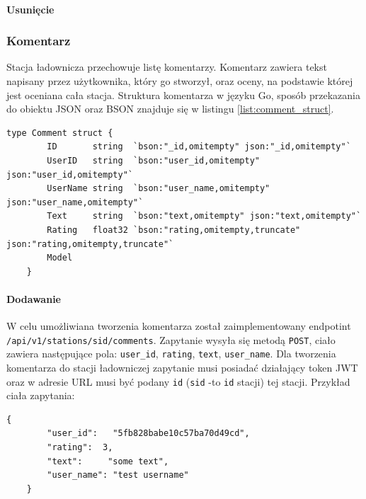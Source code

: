 \paragraph{Usunięcie}
\subsubsection{Komentarz}
Stacja ładownicza przechowuje listę komentarzy. Komentarz zawiera tekst napisany przez użytkownika, który go stworzył, oraz oceny, na podstawie której jest oceniana cała stacja.
Struktura komentarza w języku Go, sposób przekazania do obiektu JSON oraz BSON znajduje się w listingu \ref{list:comment_struct}.
\begin{lstlisting}[label=list:comment_struct,caption=Struktura komentarza,basicstyle=\tiny\ttfamily]
    type Comment struct {
        ID       string  `bson:"_id,omitempty" json:"_id,omitempty"`
        UserID   string  `bson:"user_id,omitempty" json:"user_id,omitempty"`
        UserName string  `bson:"user_name,omitempty" json:"user_name,omitempty"`
        Text     string  `bson:"text,omitempty" json:"text,omitempty"`
        Rating   float32 `bson:"rating,omitempty,truncate" json:"rating,omitempty,truncate"`
        Model
    }
\end{lstlisting}

\paragraph{Dodawanie}
W celu umożliwiana tworzenia komentarza został zaimplementowany endpotint \texttt{/api/v1/stations/{sid}/comments}.
Zapytanie wysyła się metodą \texttt{POST}, ciało zawiera następujące pola: \texttt{user\_id}, \texttt{rating}, \texttt{text}, \texttt{user\_name}.
Dla tworzenia komentarza do stacji ładowniczej zapytanie musi posiadać działający token JWT oraz w adresie URL musi być podany \texttt{id} (\texttt{sid} -to \texttt{id} stacji) tej stacji.
Przykład ciała zapytania:
\begin{lstlisting}[basicstyle=\tiny\ttfamily]
    {
		"user_id":   "5fb828babe10c57ba70d49cd",
		"rating":  3,
		"text":     "some text",
		"user_name": "test username"
    }
\end{lstlisting}

